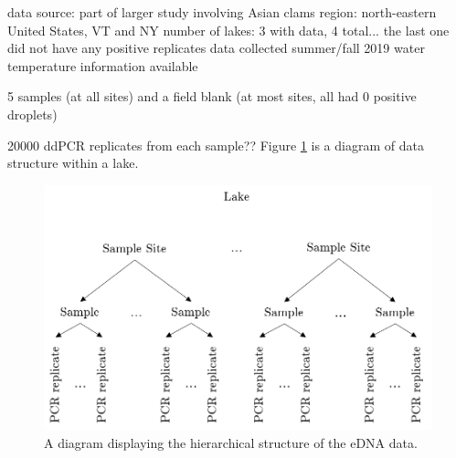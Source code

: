 \documentclass[12pt]{article}\usepackage[]{graphicx}\usepackage[]{color}
\begin{document}
data source: part of larger study involving Asian clams 
region: north-eastern United States, VT and NY
number of lakes: 3 with data, 4 total... the last one did not have any positive replicates
data collected summer/fall 2019
water temperature information available

5 samples (at all sites) and a field blank (at most sites, all had 0 positive droplets)
  \item 20000 ddPCR replicates from each sample?? Figure \ref{edna} is a diagram of data structure within a lake. 

\begin{figure}[h]
	\centering
	\includegraphics[scale = 0.7]{eDNA}
	\caption{A diagram displaying the hierarchical structure of the eDNA data.}
	\label{edna}
\end{figure}
\end{document}
